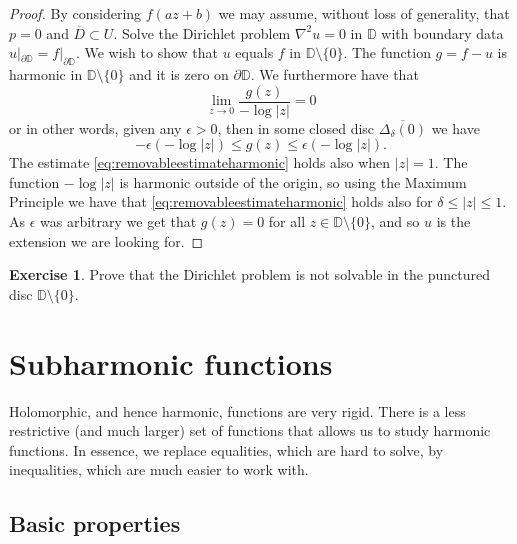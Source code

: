 \documentclass[12pt,openany]{book}
\newcommand{\sabs}[1]{\lvert {#1} \rvert}
\newcommand{\D}{{\mathbb{D}}}
\theoremstyle{plain}
\theoremstyle{remark}
\theoremstyle{definition}
\newenvironment{exbox}{%
    \def\FrameCommand{\vrule width 1pt \relax\hspace {10pt}}%
    \MakeFramed {\advance \hsize -\width \FrameRestore }%
}{%
    \endMakeFramed
}
\theoremstyle{exercise}
\newtheorem{exercise}{Exercise}[section]
\theoremstyle{example}
\begin{document}
\begin{proof}
By considering $f(a z + b)$ we may assume, without loss of generality,
that $p = 0$ and $\overline{D} \subset U$.  Solve the Dirichlet problem
$\nabla^2 u = 0$
in $\D$ with boundary data $u|_{\partial \D} = f|_{\partial \D}$.
We wish to show that $u$ equals $f$ in $\D \setminus \{0\}$.
The function
$g = f - u$ is harmonic in $\D \setminus \{ 0 \}$ and it is zero on
$\partial \D$.  We furthermore have that
\begin{equation*}
\lim_{z \to 0} \frac{g(z)}{-\log \sabs{z}} = 0
\end{equation*}
or in other words, given any $\epsilon > 0$, then
in some closed disc $\overline{\Delta_\delta(0)}$ we have
\begin{equation} \label{eq:removableestimateharmonic}
-\epsilon (- \log\sabs{z})
\leq
g(z)
\leq
\epsilon (- \log\sabs{z}) .
\end{equation}
The estimate \eqref{eq:removableestimateharmonic} holds also when
$\sabs{z}=1$.
The function $-\log\sabs{z}$ is harmonic outside of the origin, so
using the Maximum Principle we have that
\eqref{eq:removableestimateharmonic} holds also for $\delta \leq \sabs{z}
\leq 1$.  As $\epsilon$ was arbitrary we get that $g(z) = 0$ for all
$z \in \D \setminus \{0\}$, and so $u$ is the extension we are looking for.
\end{proof}

\begin{exbox}
\begin{exercise}
Prove that the Dirichlet problem is not solvable in the punctured disc $\D
\setminus \{ 0 \}$.
\end{exercise}
\end{exbox}



\section{Subharmonic functions}
\label{sec:subharmonic}

Holomorphic, and hence harmonic, functions are very rigid.
There is a less restrictive (and much larger) set of functions that allows
us to study harmonic functions.  In essence, we replace equalities, which are
hard to solve, by inequalities, which are much easier to work with.

\subsection{Basic properties}
\end{document}
